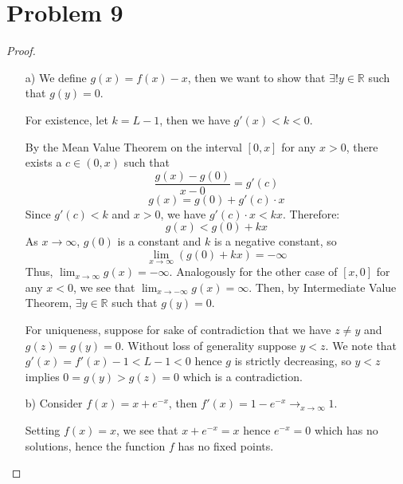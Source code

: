 \documentclass[11pt]{article}
\newcommand{\bbR}{\mathbb{R}}
\renewcommand{\_}[1]{\underline{ #1 }}
\theoremstyle{definition}
\numberwithin{equation}{subsection}
\begin{document}
\section*{Problem 9}
\begin{proof}
\begin{enumerate}
    \item[a)] We define $g(x) = f(x)-x$, then we want to show that $\exists! y \in \bbR$ such that $g(y)=0$.

For existence, let $k = L - 1$, then we have $g'(x) < k<0$.
    
    By the Mean Value Theorem on the interval $[0, x]$ for any $x > 0$, there exists a $c \in (0, x)$ such that
    $$ \frac{g(x) - g(0)}{x - 0} = g'(c) $$
    $$ g(x) = g(0) + g'(c) \cdot x $$
    Since $g'(c) < k$ and $x > 0$, we have $g'(c) \cdot x < kx$. Therefore:
    $$ g(x) < g(0) + kx $$
    As $x \to \infty$, $g(0)$ is a constant and $k$ is a negative constant, so
    $$ \lim_{x \to \infty} (g(0) + kx) = -\infty $$
    Thus, $\lim_{x \to \infty} g(x) = -\infty$. Analogously for the other case of $[x,0]$ for any $x<0$, we see that $\lim_{x \to -\infty} g(x) = \infty$. Then, by Intermediate Value Theorem, $\exists y \in \bbR$ such that $g(y)=0$.

For uniqueness, suppose for sake of contradiction that we have $z\neq y$ and $g(z)=g(y)=0$. Without loss of generality suppose $y<z$. We note that $g'(x)=f'(x)-1<L-1<0$ hence $g$ is strictly decreasing, so $y<z$ implies $0=g(y)>g(z)=0$ which is a contradiction.

\item[b)] Consider $f(x)=x+e^{-x}$, then $f'(x)=1-e^{-x} \to_{x\to \infty} 1$.

Setting $f(x)=x$, we see that $x+e^{-x} =x$ hence $e^{-x}=0$ which has no solutions, hence the function $f$ has no fixed points.

\end{enumerate}
\end{proof}

\bigskip
\end{document}
